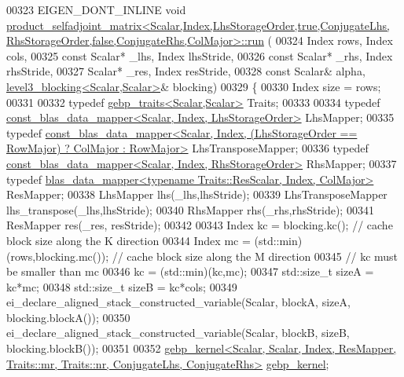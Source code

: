 \begin{DoxyCode}
00323 EIGEN\_DONT\_INLINE \textcolor{keywordtype}{void} 
      \hyperlink{struct_eigen_1_1internal_1_1product__selfadjoint__matrix}{product\_selfadjoint\_matrix<Scalar,Index,LhsStorageOrder,true,ConjugateLhs,
       RhsStorageOrder,false,ConjugateRhs,ColMajor>::run}
      (
00324     Index rows, Index cols,
00325     \textcolor{keyword}{const} Scalar* \_lhs, Index lhsStride,
00326     \textcolor{keyword}{const} Scalar* \_rhs, Index rhsStride,
00327     Scalar* \_res,        Index resStride,
00328     \textcolor{keyword}{const} Scalar& alpha, \hyperlink{class_eigen_1_1internal_1_1level3__blocking}{level3\_blocking<Scalar,Scalar>}& blocking)
00329   \{
00330     Index size = rows;
00331 
00332     \textcolor{keyword}{typedef} \hyperlink{class_eigen_1_1internal_1_1gebp__traits}{gebp\_traits<Scalar,Scalar>} Traits;
00333 
00334     \textcolor{keyword}{typedef} \hyperlink{class_eigen_1_1internal_1_1const__blas__data__mapper}{const\_blas\_data\_mapper<Scalar, Index, LhsStorageOrder>}
       LhsMapper;
00335     \textcolor{keyword}{typedef} 
      \hyperlink{class_eigen_1_1internal_1_1const__blas__data__mapper}{const\_blas\_data\_mapper<Scalar, Index, (LhsStorageOrder == RowMajor) ? ColMajor : RowMajor>}
       LhsTransposeMapper;
00336     \textcolor{keyword}{typedef} \hyperlink{class_eigen_1_1internal_1_1const__blas__data__mapper}{const\_blas\_data\_mapper<Scalar, Index, RhsStorageOrder>}
       RhsMapper;
00337     \textcolor{keyword}{typedef} \hyperlink{class_eigen_1_1internal_1_1blas__data__mapper}{blas\_data\_mapper<typename Traits::ResScalar, Index, ColMajor>}
       ResMapper;
00338     LhsMapper lhs(\_lhs,lhsStride);
00339     LhsTransposeMapper lhs\_transpose(\_lhs,lhsStride);
00340     RhsMapper rhs(\_rhs,rhsStride);
00341     ResMapper res(\_res, resStride);
00342 
00343     Index kc = blocking.kc();                   \textcolor{comment}{// cache block size along the K direction}
00344     Index mc = (std::min)(rows,blocking.mc());  \textcolor{comment}{// cache block size along the M direction}
00345     \textcolor{comment}{// kc must be smaller than mc}
00346     kc = (std::min)(kc,mc);
00347     std::size\_t sizeA = kc*mc;
00348     std::size\_t sizeB = kc*cols;
00349     ei\_declare\_aligned\_stack\_constructed\_variable(Scalar, blockA, sizeA, blocking.blockA());
00350     ei\_declare\_aligned\_stack\_constructed\_variable(Scalar, blockB, sizeB, blocking.blockB());
00351 
00352     
      \hyperlink{struct_eigen_1_1internal_1_1gebp__kernel}{gebp\_kernel<Scalar, Scalar, Index, ResMapper, Traits::mr, Traits::nr, ConjugateLhs, ConjugateRhs>}
       \hyperlink{struct_eigen_1_1internal_1_1gebp__kernel}{gebp\_kernel};

\end{DoxyCode}

